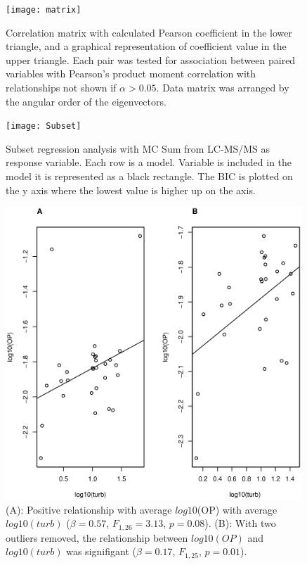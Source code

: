 \begin{figure}

  \texttt{[image: matrix]}
  \vspace*{-10mm}
  \caption{
  Correlation matrix with calculated Pearson coefficient in the lower triangle, and a graphical representation of coefficient value in the upper triangle. Each pair was tested for association between paired variables with Pearson's product moment correlation with relationships not shown if $\alpha>0.05$. Data matrix was arranged by the angular order of the eigenvectors.}
  \label{matrix}
\end{figure}


\begin{figure}[!ht]
  \texttt{[image: Subset]}
  \caption{Subset regression analysis with MC Sum from LC-MS/MS as response variable. Each row is a model. Variable is included in the model it is represented as a black rectangle. The BIC is plotted on the y axis where the lowest value is higher up on the axis.}
  \label{subset}
\end{figure}

\begin{figure}
\includegraphics[width=\textwidth, height=11cm]{figures/plot1}
\caption{
(A): Positive relationship with average $log10$(OP) with average $log10(turb)$ ($\beta=0.57$, $F_{{1,26}}=3.13$, $p=0.08$).
(B): With two outliers removed, the relationship between $log10(OP)$ and $log10(turb)$ was signifigant  ($\beta=0.17$, $F_{{1,25}}$, $p=0.01$).
}
\label{fig:plot1}
\end{figure}

